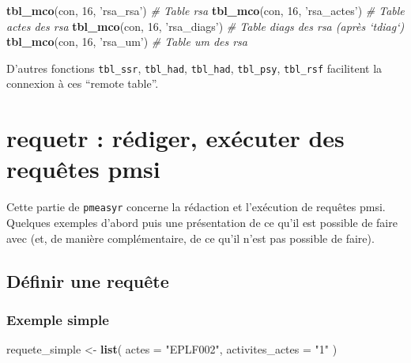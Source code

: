\documentclass[]{book}
\newenvironment{Shaded}{\begin{snugshade}}{\end{snugshade}}
\newcommand{\CommentTok}[1]{\textcolor[rgb]{0.56,0.35,0.01}{\textit{#1}}}
\newcommand{\DataTypeTok}[1]{\textcolor[rgb]{0.13,0.29,0.53}{#1}}
\newcommand{\DecValTok}[1]{\textcolor[rgb]{0.00,0.00,0.81}{#1}}
\newcommand{\KeywordTok}[1]{\textcolor[rgb]{0.13,0.29,0.53}{\textbf{#1}}}
\newcommand{\NormalTok}[1]{#1}
\newcommand{\StringTok}[1]{\textcolor[rgb]{0.31,0.60,0.02}{#1}}
\begin{document}
\begin{Shaded}
\begin{Highlighting}[]
\KeywordTok{tbl_mco}\NormalTok{(con, }\DecValTok{16}\NormalTok{, }\StringTok{'rsa_rsa'}\NormalTok{) }\CommentTok{# Table rsa}
\KeywordTok{tbl_mco}\NormalTok{(con, }\DecValTok{16}\NormalTok{, }\StringTok{'rsa_actes'}\NormalTok{) }\CommentTok{# Table actes des rsa}
\KeywordTok{tbl_mco}\NormalTok{(con, }\DecValTok{16}\NormalTok{, }\StringTok{'rsa_diags'}\NormalTok{) }\CommentTok{# Table diags des rsa (après `tdiag`)}
\KeywordTok{tbl_mco}\NormalTok{(con, }\DecValTok{16}\NormalTok{, }\StringTok{'rsa_um'}\NormalTok{) }\CommentTok{# Table um des rsa }
\end{Highlighting}
\end{Shaded}

D'autres fonctions \texttt{tbl\_ssr}, \texttt{tbl\_had}, \texttt{tbl\_had}, \texttt{tbl\_psy}, \texttt{tbl\_rsf} facilitent la connexion à ces ``remote table''.

\hypertarget{requetr-rediger-executer-des-requetes-pmsi}{%
\chapter{requetr : rédiger, exécuter des requêtes pmsi}\label{requetr-rediger-executer-des-requetes-pmsi}}

Cette partie de \texttt{pmeasyr} concerne la rédaction et l'exécution de requêtes pmsi. Quelques exemples d'abord puis une présentation de ce qu'il est possible de faire avec (et, de manière complémentaire, de ce qu'il n'est pas possible de faire).

\hypertarget{definir-une-requete}{%
\section{Définir une requête}\label{definir-une-requete}}

\hypertarget{exemple-simple}{%
\subsection{Exemple simple}\label{exemple-simple}}

\begin{Shaded}
\begin{Highlighting}[]
\NormalTok{requete_simple <-}\StringTok{ }\KeywordTok{list}\NormalTok{(}
  \DataTypeTok{actes =} \StringTok{"EPLF002"}\NormalTok{, }
  \DataTypeTok{activites_actes =} \StringTok{"1"}
\NormalTok{)}
\end{Highlighting}
\end{Shaded}
\end{document}
